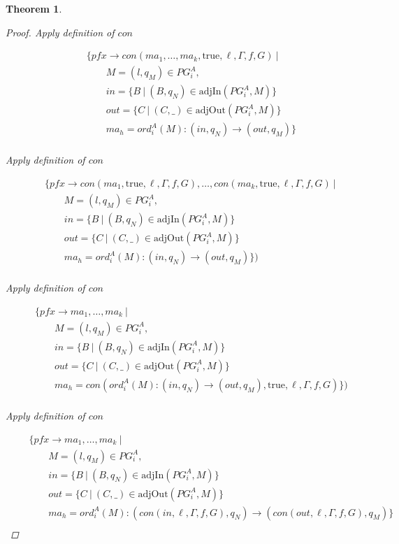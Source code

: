\documentclass[twocolumn, openany]{sig-alternate-10pt}
\newtheorem{thm}{Theorem}
\begin{document}
\begin{thm}
\begin{proof}
  Apply definition of $con$

  \[ \begin{array}{l}
     ~~~~~~~~~ \{ pfx \rightarrow con(ma_1, \dots, ma_k,\text{true},\ell,\Gamma,f,G) ~\vert~ \\
     ~~~~~~~~~~~~~~~~~~ M = (l,q_M) \in PG^A_i, \\
     ~~~~~~~~~~~~~~~~~~ in = \{ B ~\vert~ (B,q_N) \in \text{adjIn}(PG^A_i,M) \} \\
     ~~~~~~~~~~~~~~~~~~ out = \{ C ~\vert~ (C,\_) \in \text{adjOut}(PG^A_i,M) \} \\
     ~~~~~~~~~~~~~~~~~~ ma_h = ord^A_i(M) : (in,q_N) \rightarrow (out,q_M) \} \\
  \end{array} \]%

  Apply definition of $con$

  \[ \begin{array}{l}
     ~~~~~~~~~ \{ pfx \rightarrow con(ma_1,\text{true},\ell,\Gamma,f,G), \dots, con(ma_k,\text{true},\ell,\Gamma,f,G) ~\vert~ \\
     ~~~~~~~~~~~~~~~~~~ M = (l,q_M) \in PG^A_i, \\
     ~~~~~~~~~~~~~~~~~~ in = \{ B ~\vert~ (B,q_N) \in \text{adjIn}(PG^A_i,M) \} \\
     ~~~~~~~~~~~~~~~~~~ out = \{ C ~\vert~ (C,\_) \in \text{adjOut}(PG^A_i,M) \} \\
     ~~~~~~~~~~~~~~~~~~ ma_h = ord^A_i(M) : (in,q_N) \rightarrow (out,q_M) \}) \\
  \end{array} \]%

  Apply definition of $con$

  \[ \begin{array}{l}
     ~~~~~~~~~ \{ pfx \rightarrow ma_1, \dots, ma_k ~\vert~ \\
     ~~~~~~~~~~~~~~~~~~ M = (l,q_M) \in PG^A_i, \\
     ~~~~~~~~~~~~~~~~~~ in = \{ B ~\vert~ (B,q_N) \in \text{adjIn}(PG^A_i,M) \} \\
     ~~~~~~~~~~~~~~~~~~ out = \{ C ~\vert~ (C,\_) \in \text{adjOut}(PG^A_i,M) \} \\
     ~~~~~~~~~~~~~~~~~~ ma_h = con(ord^A_i(M) : (in,q_N) \rightarrow (out,q_M), \text{true},\ell,\Gamma,f,G) \}) \\
  \end{array} \]%

  Apply definition of $con$

  \[ \begin{array}{l}
     ~~~~~~~~~ \{ pfx \rightarrow ma_1, \dots, ma_k ~\vert~ \\
     ~~~~~~~~~~~~~~~~~~ M = (l,q_M) \in PG^A_i, \\
     ~~~~~~~~~~~~~~~~~~ in = \{ B ~\vert~ (B,q_N) \in \text{adjIn}(PG^A_i,M) \} \\
     ~~~~~~~~~~~~~~~~~~ out = \{ C ~\vert~ (C,\_) \in \text{adjOut}(PG^A_i,M) \} \\
     ~~~~~~~~~~~~~~~~~~ ma_h = ord^A_i(M) : (con(in,\ell,\Gamma,f,G),q_N) \rightarrow (con(out,\ell,\Gamma,f,G),q_M) \} \\
  \end{array} \]%


\end{proof}
\end{thm}
\end{document}

